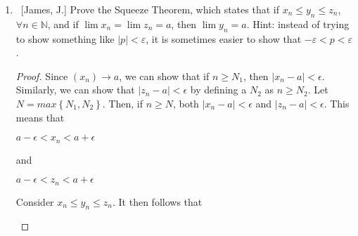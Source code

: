 \documentclass[10pt]{article}
\begin{document}
\begin{enumerate}
\begin{enumerate}
\begin{proof}
\begin{center}
     $\frac{4}{\epsilon^2}<n+3$

     $\frac{4}{\epsilon^2} - 3 < n$

     $\frac{4}{\epsilon^2}-\frac{3}{1} \cdot \frac{\epsilon^2}{\epsilon^2} < n$

     $\frac{4-3\epsilon^2}{\epsilon^2}< n$
     
     \end{center}
     
     Step 1: Let $\epsilon > 0$.
     
     Step 2: Let's choose $N > \frac{4-3\epsilon^2}{\epsilon^2}$, then $n > N$ implies that $n+3 > \frac{4}{\epsilon^2}$, and $\sqrt{n+3}>\frac{2}{\epsilon}$, so $\frac{2}{\sqrt{n+3}}<\epsilon$.
     
     Step 3: Let $n \geq N$.
     
     Step 4: Consider
     \begin{center}
     $|a_n-a| = |\frac{2}{\sqrt{n+3}}-0|$
     
    $=|\frac{2}{\sqrt{n+3}}|$
     $<\epsilon$

     \end{center}
     Therefore $\lim \frac{2}{\sqrt{n+3}} \rightarrow 0$.
     
 \end{proof}
	\end{enumerate}
	

\item  ~[James, J.] Prove the Squeeze Theorem, which states that if $x_n \leq y_n \leq z_n$, $\forall n \in \mathbb{N}$, and if $\lim x_n = \lim z_n = a$, then $\lim y_n = a$.  Hint: instead of trying to show something like $|p| < \varepsilon$, it is sometimes easier to show that $-\varepsilon < p < \varepsilon$.
	\begin{proof}
 Since $(x_n) \rightarrow a$, we can show that if $n \geq N_1$, then $|x_n-a|<\epsilon$.  Similarly, we can show that $|z_n-a|<\epsilon$ by defining a $N_2$ as $n \geq N_2$.  Let $N = max\left\{N_1,N_2\right\}$.  Then, if $n \geq N$, both $|x_n-a|<\epsilon$ and $|z_n-a|<\epsilon$.  This means that
 \begin{center}

 $a - \epsilon < x_n < a + \epsilon$

 and

 $a - \epsilon < z_n < a + \epsilon$
 
 \end{center}

 Consider $x_n \leq y_n \leq z_n$.  It then follows that
 \begin{center}


\end{center}
\end{proof}
\end{enumerate}
\end{document}
